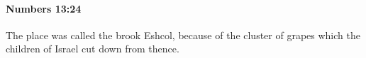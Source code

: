 
		\paragraph{Numbers 13:24} %
			\label{NUMBERS-13-24}

			The place was called the brook Eshcol, because of the cluster of grapes which the children of Israel cut down from thence.


